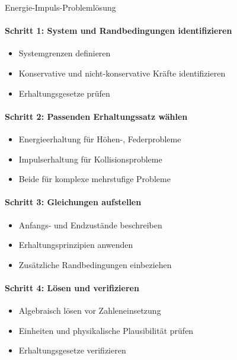 \begin{KR}{Energie-Impuls-Problemlösung}
    \paragraph{Schritt 1: System und Randbedingungen identifizieren}
    \begin{itemize}
        \item Systemgrenzen definieren
        \item Konservative und nicht-konservative Kräfte identifizieren
        \item Erhaltungsgesetze prüfen
    \end{itemize}
    
    \paragraph{Schritt 2: Passenden Erhaltungssatz wählen}
    \begin{itemize}
        \item Energieerhaltung für Höhen-, Federprobleme
        \item Impulserhaltung für Kollisionsprobleme
        \item Beide für komplexe mehrstufige Probleme
    \end{itemize}
    
    \paragraph{Schritt 3: Gleichungen aufstellen}
    \begin{itemize}
        \item Anfangs- und Endzustände beschreiben
        \item Erhaltungsprinzipien anwenden
        \item Zusätzliche Randbedingungen einbeziehen
    \end{itemize}
    
    \paragraph{Schritt 4: Lösen und verifizieren}
    \begin{itemize}
        \item Algebraisch lösen vor Zahleneinsetzung
        \item Einheiten und physikalische Plausibilität prüfen
        \item Erhaltungsgesetze verifizieren
    \end{itemize}
\end{KR}

